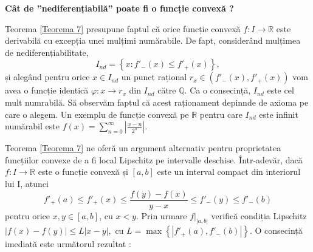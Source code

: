\documentclass[a4paper,12pt,oneside]{report}
\begin{document}
\textbf{Cât de ”nediferențiabilă” poate fi o funcție convexă ?}

Teorema \ref{Teorema 7} presupune faptul că orice funcție convexă \(f:I \rightarrow \mathbb{R}\) este derivabilă cu excepția unei mulțimi numărabile. De fapt, considerând mulțimea de nediferențiabilitate, 
\begin{displaymath}
   I_{nd} = \left \{ x : {f}'_{-}\left ( x \right )\leq {f}'_{+}\left ( x \right ) \right \}, 
\end{displaymath}
și alegând pentru orice \(x \in I_{nd}\) un punct rațional \(r_{x} \in \left ( {f}'_{-}\left ( x \right ),  {f}'_{+}\left ( x \right )  \right )\) vom avea o funcție identică \(\varphi : x \rightarrow r_{x}\) din \(I_{nd}\) către \(\mathbb{Q}\). Ca o consecință, \(I_{nd}\) este cel mult numrabilă. Să observăm faptul că acest raționament depinnde de axioma pe care o alegem. Un exemplu de funcție convexă pe \(\mathbb{R}\) pentru care \(I_{nd}\) este infinit numărabil este \(f\left ( x \right ) = \sum_{n = 0}^{\infty } \left | \frac{x-n}{2^{n}}\right |\). 

Teorema \ref{Teorema 7} ne oferă un argument alternativ pentru proprietatea funcțiilor convexe de a fi local Lipschitz pe intervalle deschise. Într-adevăr, dacă \(f : I \rightarrow \mathbb{R}\) este o funcție convexă și \(\left [ a,b \right ]\) este un interval compact din interiorul lui I, atunci 
\begin{displaymath}
   {f}'_{+}\left ( a \right ) \leq {f}'_{+}\left ( x \right )\leq \frac{f\left ( y \right )- f\left ( x \right )}{y-x}\leq  {f}'_{-}\left ( y \right )\leq {f}'_{-}\left ( b \right )
\end{displaymath}
pentru orice \(x,y \in \left [ a,b \right ]\), cu \(x< y\). Prin urmare \(f|_{\left | a,b \right |}\) verifică condiția Lipschitz \(\left | f\left ( x \right )  - f\left ( y \right )\right |\leq L\left | x-y \right |,\) cu \(L=\max \left \{ \left | {f}'_{+} \left ( a \right ),{f}'_{-} \left ( b \right ) \right | \right \}\). O consecință imediată este următorul rezultat :
\end{document}
